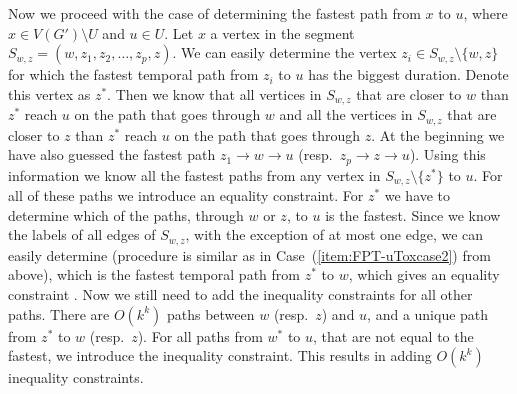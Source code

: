 \documentclass[11pt,a4paper]{article}
\theoremstyle{remark}
\theoremstyle{definition}
\begin{document}
Now we proceed with the case of determining the fastest path from $x$ to $u$, where $x \in V(G') \setminus U$ and $u \in U$.
Let $x$ a vertex in the segment $S_{w,z} = (w,z_1,z_2, \dots, z_p, z)$.
We can easily determine the vertex $z_i \in S_{w,z}\setminus\{w,z\}$ for which the fastest temporal path from $z_i$ to $u$ has the biggest duration.
Denote this vertex as $z^*$. 
Then we know that all vertices in $S_{w,z}$ that are closer to $w$ than $z^*$ reach $u$ on the path that goes through $w$ and 
all the vertices in $S_{w,z}$ that are closer to $z$ than $z^*$ reach $u$ on the path that goes through $z$.
At the beginning we have also guessed the fastest path $z_1 \rightarrow w \rightarrow u$ (resp.~$z_p \rightarrow z \rightarrow u$).
Using this information we know all the fastest paths from any vertex in $S_{w,z} \setminus \{ z^* \}$ to $u$.
For all of these paths we introduce an equality constraint. 
For $z^*$ we have to determine which of the paths, through $w$ or $z$, to $u$ is the fastest.
Since we know the labels of all edges of $S_{w,z}$, with the exception of at most one edge, we can easily determine (procedure is similar as in Case~(\ref{item:FPT-uToxcase2}) from above),
which is the fastest temporal path from $z^*$ to $w$, which gives an equality constraint .
Now
we still need to add the inequality constraints for all other paths.
There are $O(k^k)$ paths between $w$ (resp.~$z$) and $u$, and a unique path from $z^*$ to $w$ (resp.~$z$).
For all paths from $w^*$ to $u$, that are not equal to the fastest, we introduce the inequality constraint.
This results in adding $O(k^k)$ inequality constraints.
\end{document}
